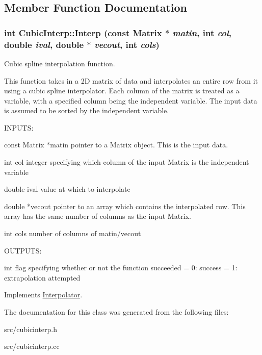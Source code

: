 \subsection{Member Function Documentation}
\hypertarget{classCubicInterp_a19da3e57e56c37f0b83f37f7217a8a0c}{
\subsubsection[{Interp}]{\setlength{\rightskip}{0pt plus 5cm}int CubicInterp::Interp (const {\bf Matrix} $\ast$ {\em matin}, \/  int {\em col}, \/  double {\em ival}, \/  double $\ast$ {\em vecout}, \/  int {\em cols})}}
\label{dd/de9/classCubicInterp_a19da3e57e56c37f0b83f37f7217a8a0c}


Cubic spline interpolation function. 

This function takes in a 2D matrix of data and interpolates an entire row from it using a cubic spline interpolator. Each column of the matrix is treated as a variable, with a specified column being the independent variable. The input data is assumed to be sorted by the independent variable.

\begin{DoxyVerb}
  INPUTS:

  const Matrix *matin    pointer to a Matrix object. This is the input data.

  int col                integer specifying which column of the input Matrix is the independent
                         variable

  double ival            value at which to interpolate

  double *vecout         pointer to an array which contains the interpolated row. This array has
                         the same number of columns as the input Matrix.

  int cols               number of columns of matin/vecout

  OUTPUTS:

  int                    flag specifying whether or not the function succeeded
                         = 0: success
			 = 1: extrapolation attempted
  \end{DoxyVerb}
 

Implements \hyperlink{classInterpolator_a2238defccb009047f624bda33cc47c73}{Interpolator}.



The documentation for this class was generated from the following files:\begin{DoxyCompactItemize}
\item 
src/cubicinterp.h\item 
src/cubicinterp.cc\end{DoxyCompactItemize}
